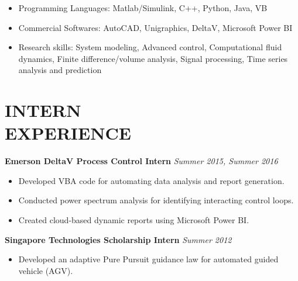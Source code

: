 \documentclass[margin, 9pt]{res} %
\begin{document}
\begin{resume}
\vspace*{-2pt}
\begin{itemize}[leftmargin=*] \itemsep -4pt
	\item Programming Languages: Matlab/Simulink, C++, Python, Java, VB
	\item Commercial Softwares: AutoCAD, Unigraphics, DeltaV, Microsoft Power BI
	\item Research skills: System modeling, Advanced control, Computational fluid dynamics, Finite difference/volume analysis, Signal processing, Time series analysis and prediction
\end{itemize}


\section{INTERN\\ EXPERIENCE}

{\textbf{Emerson DeltaV Process Control Intern}} \hfill\textit{Summer 2015, Summer 2016}\\
\vspace*{-10pt}
\begin{itemize}[leftmargin=*] \itemsep -3pt
\vspace*{-5pt}
	\item Developed VBA code for automating data analysis and report generation.
	\item Conducted power spectrum analysis for identifying interacting control loops.
	\item Created cloud-based dynamic reports using Microsoft Power BI.
\end{itemize}

\medskip
{\textbf{Singapore Technologies Scholarship Intern}} \hfill\textit{Summer 2012}\\
\vspace*{-10pt}
\begin{itemize}[leftmargin=*] \itemsep -3pt
\vspace*{-5pt}
	\item Developed an adaptive Pure Pursuit guidance law for automated guided vehicle (AGV).
\end{itemize}



\end{resume}
\end{document}
